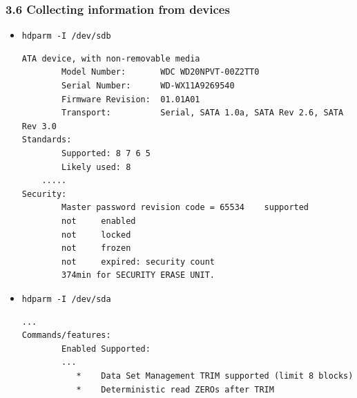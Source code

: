 \begin{frame}[fragile]
  \frametitle{3.6 Collecting information from devices}
    \begin{itemize}
        \item[] \texttt{hdparm -I /dev/sdb}
\begin{lstlisting}[basicstyle=\tiny]
ATA device, with non-removable media
        Model Number:       WDC WD20NPVT-00Z2TT0                    
        Serial Number:      WD-WX11A9269540
        Firmware Revision:  01.01A01
        Transport:          Serial, SATA 1.0a, SATA Rev 2.6, SATA Rev 3.0
Standards:
        Supported: 8 7 6 5 
        Likely used: 8
	.....
Security: 
        Master password revision code = 65534    supported
        not     enabled
        not     locked
        not     frozen
        not     expired: security count
        374min for SECURITY ERASE UNIT.
\end{lstlisting}
        \item[] \texttt{hdparm -I /dev/sda}
\begin{lstlisting}[basicstyle=\tiny]
...
Commands/features:
        Enabled Supported:
        ...
           *    Data Set Management TRIM supported (limit 8 blocks)
           *    Deterministic read ZEROs after TRIM
\end{lstlisting}
    \end{itemize}
\end{frame}














